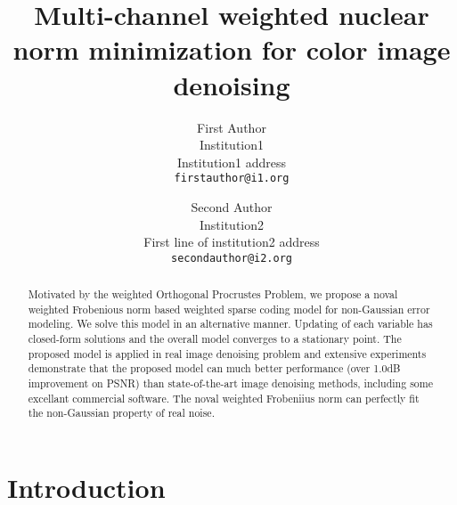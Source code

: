 \documentclass[10pt,twocolumn,letterpaper]{article}
\begin{document}
\title{Multi-channel weighted nuclear norm minimization for color image denoising}

\author{First Author\\
Institution1\\
Institution1 address\\
{\tt\small firstauthor@i1.org}
\and
Second Author\\
Institution2\\
First line of institution2 address\\
{\tt\small secondauthor@i2.org}
}

\maketitle

\begin{abstract}
Motivated by the weighted Orthogonal Procrustes Problem, we propose a noval weighted Frobenious norm based weighted sparse coding model for non-Gaussian error modeling. We solve this model in an alternative manner. Updating of each variable has closed-form solutions and the overall model converges to a stationary point. The proposed model is applied in real image denoising problem and extensive experiments demonstrate that the proposed model can much better performance (over 1.0dB improvement on PSNR) than state-of-the-art image denoising methods, including some excellant commercial software. The noval weighted Frobeniius norm can perfectly fit the non-Gaussian property of real noise.
\end{abstract}

\section{Introduction}
\end{document}
